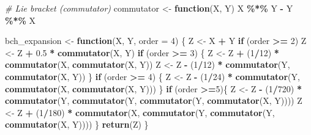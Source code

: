 \documentclass[
]{book}
\newenvironment{Shaded}{\begin{snugshade}}{\end{snugshade}}
\newcommand{\AttributeTok}[1]{\textcolor[rgb]{0.13,0.29,0.53}{#1}}
\newcommand{\CommentTok}[1]{\textcolor[rgb]{0.56,0.35,0.01}{\textit{#1}}}
\newcommand{\ControlFlowTok}[1]{\textcolor[rgb]{0.13,0.29,0.53}{\textbf{#1}}}
\newcommand{\DecValTok}[1]{\textcolor[rgb]{0.00,0.00,0.81}{#1}}
\newcommand{\FloatTok}[1]{\textcolor[rgb]{0.00,0.00,0.81}{#1}}
\newcommand{\FunctionTok}[1]{\textcolor[rgb]{0.13,0.29,0.53}{\textbf{#1}}}
\newcommand{\NormalTok}[1]{#1}
\newcommand{\OtherTok}[1]{\textcolor[rgb]{0.56,0.35,0.01}{#1}}
\newcommand{\SpecialCharTok}[1]{\textcolor[rgb]{0.81,0.36,0.00}{\textbf{#1}}}
\theoremstyle{definition}
\theoremstyle{definition}
\theoremstyle{definition}
\theoremstyle{definition}
\theoremstyle{remark}
\begin{document}
\begin{Shaded}
\begin{Highlighting}[]
\CommentTok{\# Lie bracket (commutator)}
\NormalTok{commutator }\OtherTok{\textless{}{-}} \ControlFlowTok{function}\NormalTok{(X, Y) X }\SpecialCharTok{\%*\%}\NormalTok{ Y }\SpecialCharTok{{-}}\NormalTok{ Y }\SpecialCharTok{\%*\%}\NormalTok{ X}

\NormalTok{bch\_expansion }\OtherTok{\textless{}{-}} \ControlFlowTok{function}\NormalTok{(X, Y, }\AttributeTok{order =} \DecValTok{4}\NormalTok{) \{}
\NormalTok{  Z }\OtherTok{\textless{}{-}}\NormalTok{ X }\SpecialCharTok{+}\NormalTok{ Y}
  \ControlFlowTok{if}\NormalTok{ (order }\SpecialCharTok{\textgreater{}=} \DecValTok{2}\NormalTok{) Z }\OtherTok{\textless{}{-}}\NormalTok{ Z }\SpecialCharTok{+} \FloatTok{0.5} \SpecialCharTok{*} \FunctionTok{commutator}\NormalTok{(X, Y)}
  \ControlFlowTok{if}\NormalTok{ (order }\SpecialCharTok{\textgreater{}=} \DecValTok{3}\NormalTok{) \{}
\NormalTok{    Z }\OtherTok{\textless{}{-}}\NormalTok{ Z }\SpecialCharTok{+}\NormalTok{ (}\DecValTok{1}\SpecialCharTok{/}\DecValTok{12}\NormalTok{) }\SpecialCharTok{*} \FunctionTok{commutator}\NormalTok{(X, }\FunctionTok{commutator}\NormalTok{(X, Y))}
\NormalTok{    Z }\OtherTok{\textless{}{-}}\NormalTok{ Z }\SpecialCharTok{{-}}\NormalTok{ (}\DecValTok{1}\SpecialCharTok{/}\DecValTok{12}\NormalTok{) }\SpecialCharTok{*} \FunctionTok{commutator}\NormalTok{(Y, }\FunctionTok{commutator}\NormalTok{(X, Y))}
\NormalTok{  \}}
  \ControlFlowTok{if}\NormalTok{ (order }\SpecialCharTok{\textgreater{}=} \DecValTok{4}\NormalTok{) \{}
\NormalTok{    Z }\OtherTok{\textless{}{-}}\NormalTok{ Z }\SpecialCharTok{{-}}\NormalTok{ (}\DecValTok{1}\SpecialCharTok{/}\DecValTok{24}\NormalTok{) }\SpecialCharTok{*} \FunctionTok{commutator}\NormalTok{(Y, }\FunctionTok{commutator}\NormalTok{(X, }\FunctionTok{commutator}\NormalTok{(X, Y)))}
\NormalTok{  \}}
  \ControlFlowTok{if}\NormalTok{ (order }\SpecialCharTok{\textgreater{}=}\DecValTok{5}\NormalTok{)\{}
\NormalTok{    Z }\OtherTok{\textless{}{-}}\NormalTok{ Z }\SpecialCharTok{{-}}\NormalTok{ (}\DecValTok{1}\SpecialCharTok{/}\DecValTok{720}\NormalTok{) }\SpecialCharTok{*} \FunctionTok{commutator}\NormalTok{(Y, }\FunctionTok{commutator}\NormalTok{(Y, }\FunctionTok{commutator}\NormalTok{(Y, }\FunctionTok{commutator}\NormalTok{(X, Y))))}
\NormalTok{    Z }\OtherTok{\textless{}{-}}\NormalTok{ Z }\SpecialCharTok{+}\NormalTok{ (}\DecValTok{1}\SpecialCharTok{/}\DecValTok{180}\NormalTok{) }\SpecialCharTok{*} \FunctionTok{commutator}\NormalTok{(X, }\FunctionTok{commutator}\NormalTok{(Y, }\FunctionTok{commutator}\NormalTok{(Y, }\FunctionTok{commutator}\NormalTok{(X, Y))))}
\NormalTok{  \}}
\FunctionTok{return}\NormalTok{(Z)}
\NormalTok{\}}
\end{Highlighting}
\end{Shaded}
\end{document}
